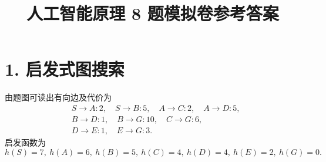 \documentclass[UTF8,zihao=-4]{ctexart}
\title{\textbf{人工智能原理 8 题模拟卷参考答案}}
\author{}
\date{}
\begin{document}
\maketitle

\section*{1. 启发式图搜索}

由题图可读出有向边及代价为
\[
\begin{aligned}
&S\to A:2,\quad S\to B:5,\quad A\to C:2,\quad A\to D:5,\\
&B\to D:1,\quad B\to G:10,\quad C\to G:6,\\
&D\to E:1,\quad E\to G:3.
\end{aligned}
\]
启发函数为
\[
h(S)=7,\ h(A)=6,\ h(B)=5,\ h(C)=4,\ h(D)=4,\ h(E)=2,\ h(G)=0.
\]
\end{document}
